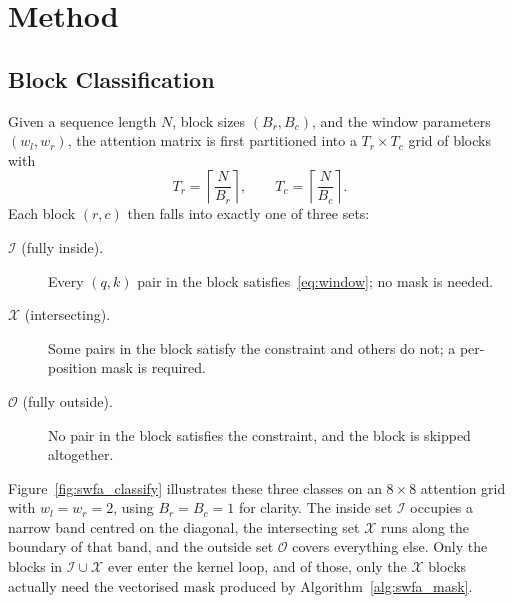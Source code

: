 \section{Method}\label{sec:swfa_method}

\subsection{Block Classification}\label{sec:swfa_classify}
Given a sequence length $N$, block sizes $(B_r, B_c)$, and the
window parameters $(w_l, w_r)$, the attention matrix is first
partitioned into a $T_r \times T_c$ grid of blocks with
\begin{equation}
T_r = \left\lceil \frac{N}{B_r} \right\rceil, \qquad
T_c = \left\lceil \frac{N}{B_c} \right\rceil .
\end{equation}
Each block $(r, c)$ then falls into exactly one of three sets:
\begin{description}
    \item[$\mathcal{I}$ (fully inside).] Every $(q, k)$ pair in
          the block satisfies~\eqref{eq:window}; no mask is
          needed.
    \item[$\mathcal{X}$ (intersecting).] Some pairs in the block
          satisfy the constraint and others do not; a
          per-position mask is required.
    \item[$\mathcal{O}$ (fully outside).] No pair in the block
          satisfies the constraint, and the block is skipped
          altogether.
\end{description}

Figure~\ref{fig:swfa_classify} illustrates these three classes on
an $8 \times 8$ attention grid with $w_l = w_r = 2$, using
$B_r = B_c = 1$ for clarity. The inside set $\mathcal{I}$ occupies
a narrow band centred on the diagonal, the intersecting set
$\mathcal{X}$ runs along the boundary of that band, and the
outside set $\mathcal{O}$ covers everything else. Only the blocks
in $\mathcal{I} \cup \mathcal{X}$ ever enter the kernel loop, and
of those, only the $\mathcal{X}$ blocks actually need the
vectorised mask produced by Algorithm~\ref{alg:swfa_mask}.


